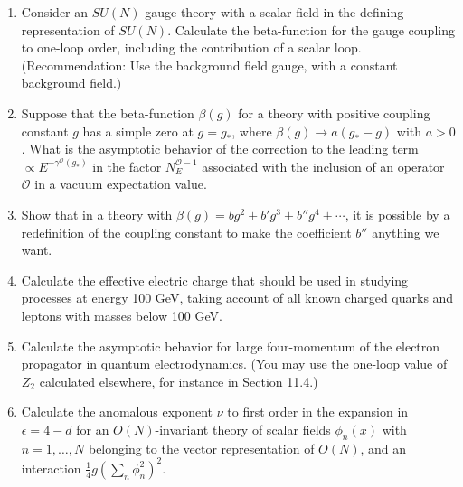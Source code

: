 

\begin{enumerate}
  \item Consider an $SU(N)$ gauge theory with a scalar field in the defining representation of $SU(N)$. Calculate the beta-function for the gauge coupling to one-loop order, including the contribution of a scalar loop. (Recommendation: Use the background field gauge, with a constant background field.)

  \item Suppose that the beta-function $\beta(g)$ for a theory with positive coupling constant $g$ has a simple zero at $g=g_*$, where $\beta(g)\to a(g_*-g)$ with $a>0$. What is the asymptotic behavior of the correction to the leading term $\propto E^{-\gamma^{\mathcal O}(g_*)}$ in the factor $N_E^{\mathcal O-1}$ associated with the inclusion of an operator $\mathcal O$ in a vacuum expectation value.

  \item Show that in a theory with $\beta(g)=bg^2+b'g^3+b''g^4+\cdots$, it is possible by a redefinition of the coupling constant to make the coefficient $b''$ anything we want.

  \item Calculate the effective electric charge that should be used in studying processes at energy 100 GeV, taking account of all known charged quarks and leptons with masses below 100 GeV.

  \item Calculate the asymptotic behavior for large four-momentum of the electron propagator in quantum electrodynamics. (You may use the one-loop value of $Z_2$ calculated elsewhere, for instance in Section 11.4.)

  \item Calculate the anomalous exponent $\nu$ to first order in the expansion in $\epsilon=4-d$ for an $O(N)$-invariant theory of scalar fields $\phi_n(x)$ with $n=1,\ldots,N$ belonging to the vector representation of $O(N)$, and an interaction $\tfrac14 g(\sum_n\phi_n^2)^2$.
\end{enumerate}


